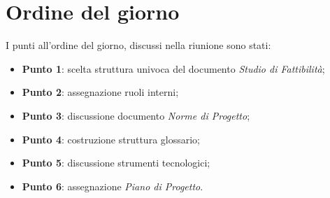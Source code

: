 \section{Ordine del giorno}
I punti all'ordine del giorno, discussi nella riunione sono stati:
\begin{itemize}

	\item \textbf{Punto 1}: scelta struttura univoca del documento \textit{Studio di Fattibilità};
	\item \textbf{Punto 2}: assegnazione ruoli interni; 
	\item \textbf{Punto 3}: discussione documento \textit{Norme di Progetto};
	\item \textbf{Punto 4}: costruzione struttura glossario; 
	\item \textbf{Punto 5}: discussione strumenti tecnologici;
	\item \textbf{Punto 6}: assegnazione \textit{Piano di Progetto}. 
\end{itemize}
